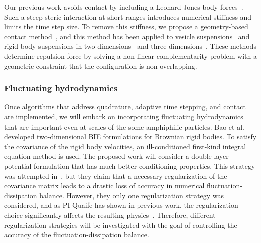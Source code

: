 Our previous work avoids contact by including a Leonard-Jones body
forces~\cite{Fu2018_SIAM}. Such a steep steric interaction at short
ranges introduces numerical stiffness and limits the time step size. To
remove this stiffness, we propose a geometry-based contact
method~\cite{har-pon-sor-zor2011}, and this method has been applied to
vesicle suspensions~\cite{lu-rah-zor2017} and rigid body suspensions in
two dimensions~\cite{bys-sha-qua2020} and three
dimensions~\cite{Yan2019}. These methods determine repulsion force by
solving a non-linear complementarity problem with a geometric constraint
that the configuration is non-overlapping.


\subsubsection{Fluctuating hydrodynamics}
\label{subsec:fluctuating}
Once algorithms that address quadrature, adaptive time stepping, and
contact are implemented, we will embark on incorporating fluctuating
hydrodynamics that are important even at scales of the some amphiphilic
particles. Bao et al.~\cite{Bao17,Bao18} developed two-dimensional BIE
formulations for Brownian rigid bodies. To satisfy the covariance of the
rigid body velocities, an ill-conditioned first-kind integral equation
method is used. The proposed work will consider a double-layer potential
formulation that has much better conditioning properties. This strategy
was attempted in~\cite{Bao18}, but they claim that a necessary
regularization of the covariance matrix leads to a drastic loss of
accuracy in numerical fluctuation-dissipation balance. However, they
only one regularization strategy was considered, and as PI Quaife has
shown in previous work, the regularization choice significantly affects
the resulting physics~\cite{ong-chr-qua2017}. Therefore, different
regularization strategies will be investigated with the goal of
controlling the accuracy of the fluctuation-dissipation balance.


